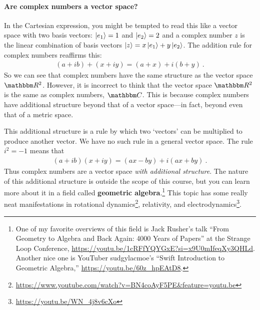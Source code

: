 \documentclass[12pt, oneside]{report}    %
\begin{document}
\paragraph{Are complex numbers a vector space?}
In the Cartesian expression, you might be tempted to read this like a vector space with two basis vectors: $\left|e_1\right\rangle=1$ and $\left|e_2\right\rangle = 2$ and a complex number $z$ is the linear combination of basis vectors $\left|z\right\rangle = x \left|e_1\right\rangle + y \left|e_2\right\rangle$. The addition rule for complex numbers reaffirms this:
\begin{align}
    (a+ib)+ (x+iy) = (a+x) + i (b+y) \ .
\end{align}
So we can see that complex numbers have the same structure as the vector space $\RR^2$. However, it is incorrect to think that the vector space $\RR^2$ is the same as complex numbers, $\CC$. This is because complex numbers have additional structure beyond that of a vector space---in fact, beyond even that of a metric space. 

This additional structure is a rule by which two `vectors' can be multiplied to produce another vector. We have no such rule in a general vector space. The rule $i^2 = -1$ means that
\begin{align}
    (a+ib)(x+iy) = (ax - by) + i (ax + by) \ .
\end{align}
Thus complex numbers are a vector space \emph{with additional structure}. The nature of this additional structure is outside the scope of this course, but you can learn more about it in a field called \textbf{geometric algebra}.\footnote{One of my favorite overviews of this field is Jack Rusher's talk ``From Geometry to Algebra and Back Again: 4000 Years of Papers'' at the Strange Loop Conference, \url{https://youtu.be/1cRFfYQYGxE?si=x9U0mIfeqXy3QHLd}. Another nice one is YouTuber sudgylacmoe's ``Swift Introduction to Geometric Algebra,'' \url{https://youtu.be/60z_hpEAtD8}.}\autocite{Doran:2007tqa} This topic has some really neat manifestations in rotational dynamics\footnote{\url{https://www.youtube.com/watch?v=BN4coAyF5PE&feature=youtu.be}}\autocite{10.1119/5.0109883}, relativity\autocite{10.1119/1.4734014}, and electrodynamics\footnote{\url{https://youtu.be/WN_4j8v6cXo}}\autocite{Dressel:2014fna}.
\end{document}
